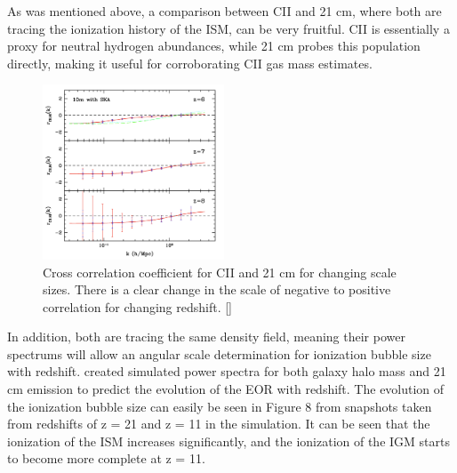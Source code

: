 \documentclass[manuscript]{aastex}
\begin{document}
As was mentioned above, a comparison between CII and 21 cm, where both are tracing the ionization history of the ISM, can be very fruitful. CII is essentially a proxy for neutral hydrogen abundances, while 21 cm probes this population directly, making it useful for corroborating CII gas mass estimates.
\begin{figure}
\vspace{-0.8cm}
  \begin{center}
    \includegraphics[width=0.48\textwidth]{gong4.png}
  \end{center}
  \caption[Cross correlation coefficient for CII and 21 cm showing ionization bubble size with redshift. -(\cite{Gong2012})]{Cross correlation coefficient for CII and 21 cm for changing scale sizes. There is a clear change in the scale of negative to positive correlation for changing redshift. [\cite{Gong2012}]}
\end{figure}
In addition, both are tracing the same density field, meaning their power spectrums will allow an angular scale determination for ionization bubble size with redshift. \cite{Santos2010} created simulated power spectra for both galaxy halo mass and 21 cm emission to predict the evolution of the EOR with redshift. The evolution of the ionization bubble size can easily be seen in Figure 8 from snapshots taken from redshifts of z = 21 and z = 11 in the simulation. It can be seen that the ionization of the ISM increases significantly, and the ionization of the IGM starts to become more complete at z = 11. 
\end{document}
